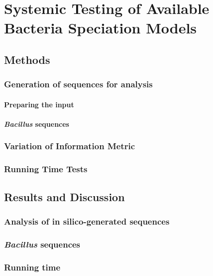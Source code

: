 \chapter{Systemic Testing of Available Bacteria Speciation Models}
\section{Methods}
\subsection{Generation of sequences for analysis}
\subsubsection{Preparing the input}
\subsubsection{\emph{Bacillus} sequences}
\subsection{Variation of Information Metric}
\subsection{Running Time Tests}
\section{Results and Discussion}
\subsection{Analysis of in silico-generated sequences}
\subsection{\emph{Bacillus} sequences}
\subsection{Running time}